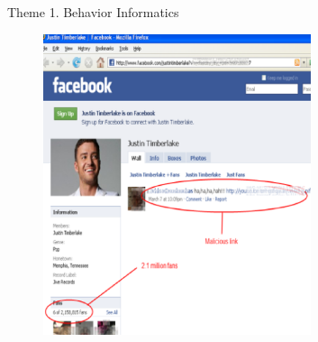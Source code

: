 \documentclass[
 size=14pt,
 paper=smartboard,  %
 mode=present, 		%
 display=slides, 	%
 style=tuliplab,  	%
 pauseslide,
 fleqn,leqno]{powerdot}
\begin{document}
\begin{slide}{Theme 1. Behavior Informatics}
{\begin{figure}[htbp]
{    }
\end{figure}
}{
\begin{figure}[htbp]
    \includegraphics[width=0.7\textwidth]{figures//theme1//Theme1_7.eps}
\end{figure}
}

\end{slide}
\end{document}

